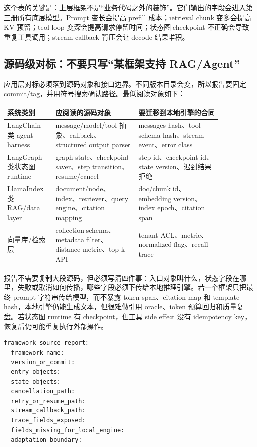 这个表的关键是：上层框架不是“业务代码之外的装饰”。它们输出的字段会进入第三册所有底层模型。Prompt 变长会提高 prefill 成本；retrieval chunk 变多会提高 KV 预留；tool loop 变深会提高请求停留时间；状态图 checkpoint 不正确会导致重复工具调用；stream callback 背压会让 decode 结果堆积。

\subsection{源码级对标：不要只写“某框架支持 RAG/Agent”}

应用层对标必须落到源码对象和接口边界。不同版本目录会变，所以报告要固定 commit/tag，并用符号搜索确认路径。最低阅读对象如下：

\begin{center}
\small
\begin{tabular}{p{0.18\linewidth}p{0.34\linewidth}p{0.34\linewidth}}
\toprule
系统类别 & 应阅读的源码对象 & 要迁移到本地引擎的合同 \\
\midrule
LangChain 类 agent harness & message/model/tool 抽象、callback、structured output parser & messages hash、tool schema hash、stream event、error class \\
LangGraph 类状态图 runtime & graph state、checkpoint saver、step transition、resume/cancel & step id、checkpoint id、state version、迟到结果拒绝 \\
LlamaIndex 类 RAG/data layer & document/node、index、retriever、query engine、citation mapping & doc/chunk id、embedding version、index epoch、citation span \\
向量库/检索层 & collection schema、metadata filter、distance metric、top-k API & tenant ACL、metric、normalized flag、recall trace \\
\bottomrule
\end{tabular}
\end{center}

报告不需要复制大段源码，但必须写清四件事：入口对象叫什么，状态字段在哪里，失败或取消如何传播，哪些字段必须下传给本地推理引擎。若一个框架只把最终 prompt 字符串传给模型，而不暴露 token span、citation map 和 template hash，本地引擎仍能生成文本，但很难做引用 oracle、token 预算回归和质量复盘。若状态图 runtime 有 checkpoint，但工具 side effect 没有 idempotency key，恢复后仍可能重复执行外部操作。

\begin{lstlisting}[numbers=none,caption={上层框架源码阅读报告字段}]
framework_source_report:
  framework_name:
  version_or_commit:
  entry_objects:
  state_objects:
  cancellation_path:
  retry_or_resume_path:
  stream_callback_path:
  trace_fields_exposed:
  fields_missing_for_local_engine:
  adaptation_boundary:
\end{lstlisting}

